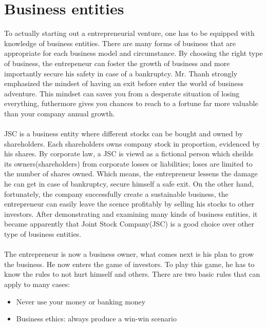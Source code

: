 \documentclass[a4paper, 11pt]{article} %
\begin{document}
\section*{Business entities}
To actually starting out a entrepreneurial venture, one has to be equipped with knowledge of business entities. There are many forms of business that are appropriate for each business model and circumstance. By choosing the right type of business, the entrepeneur can foster the growth of business and more importantly secure his safety in case of a bankruptcy. Mr. Thanh strongly emphasized the mindset of having an exit before enter the world of business adventure. This mindset can saves you from a desperate situation of losing everything, futhermore gives you chances to reach to a fortune far more valuable than your company annual growth.
\\
\\
JSC is a business entity where different stocks can be bought and owned by shareholders. Each shareholders owns company stock in proportion, evidenced by his shares. By corporate law, a JSC is viewd as a fictional person which sheilds its owners(shareholders) from corporate losses or liabilities; loses are limited to the number of shares owned. Which means, the entrepreneur lessens the damage he can get in case of bankruptcy, secure himself a safe exit. On the other hand, fortunately, the company successfully create a sustainable business, the entrepreneur can easily leave the scence profitably by selling his stocks to other investors. After demonstrating and examining many kinds of business entities, it became apparently that Joint Stock Company(JSC) is a good choice over other type of business entities.
\\
\\
The entrepreneur is now a business owner, what comes next is his plan to grow the business. He now enters the game of investors. To play this game, he has to know the rules to not hurt himself and others. There are two basic rules that can apply to many cases:
\begin{itemize}
\item{Never use your money or banking money}
\item{Business ethics: always produce a win-win scenario}
\end{itemize}
\end{document}
